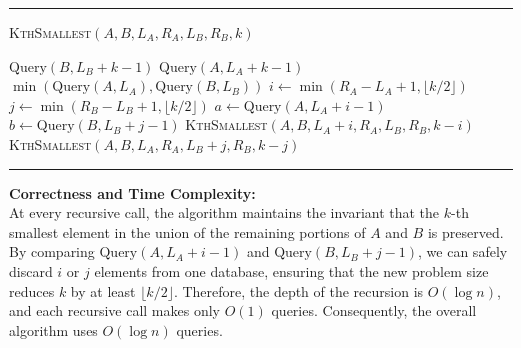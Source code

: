 \documentclass[11pt]{article}
\begin{document}
    \bigskip
    
    \par\noindent\rule{\textwidth}{0.4pt}
    \smallskip        
    \textsc{KthSmallest}$(A, B, L_A, R_A, L_B, R_B, k)$
    \begin{algorithmic}[1]
            \RETURN \(\text{Query}(B, L_B + k - 1)\)
        \ENDIF
            \RETURN \(\text{Query}(A, L_A + k - 1)\)
        \ENDIF
            \RETURN \(\min(\text{Query}(A, L_A), \text{Query}(B, L_B))\)
        \ENDIF
        \STATE \( i \gets \min(R_A - L_A + 1, \lfloor k/2 \rfloor) \)
        \STATE \( j \gets \min(R_B - L_B + 1, \lfloor k/2 \rfloor) \)
        \STATE \( a \gets \text{Query}(A, L_A + i - 1) \)
        \STATE \( b \gets \text{Query}(B, L_B + j - 1) \)
             \RETURN \textsc{KthSmallest}\((A, B, L_A + i, R_A, L_B, R_B, k - i)\)
        \ELSE
             \RETURN \textsc{KthSmallest}\((A, B, L_A, R_A, L_B + j, R_B, k - j)\)
        \ENDIF
    \end{algorithmic}
    \vspace{-2mm}
    \par\noindent\rule{\textwidth}{0.4pt}
    
    \bigskip
    
    \textbf{Correctness and Time Complexity:} \\
    At every recursive call, the algorithm maintains the invariant that the \( k \)-th smallest element in the union of the remaining portions of \( A \) and \( B \) is preserved. By comparing \(\text{Query}(A, L_A+i-1)\) and \(\text{Query}(B, L_B+j-1)\), we can safely discard \( i \) or \( j \) elements from one database, ensuring that the new problem size reduces \( k \) by at least \(\lfloor k/2 \rfloor\). Therefore, the depth of the recursion is \( O(\log n) \), and each recursive call makes only \( O(1) \) queries. Consequently, the overall algorithm uses \( O(\log n) \) queries.
    

    \newpage
\end{document}
